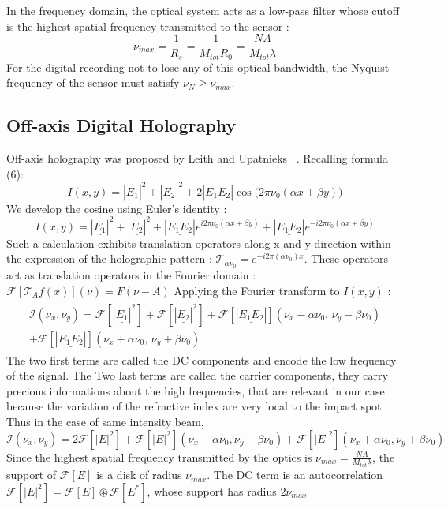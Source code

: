 \documentclass[11pt,a4paper]{article}
\begin{document}
In the frequency domain, the optical system acts as a low-pass filter whose cutoff is the highest spatial frequency transmitted to the sensor : $$\nu_{max} = \frac{1}{R_s}= \frac{1}{M_{tot}R_0}= \frac{NA}{M_{tot}\lambda}$$
For the digital recording not to lose any of this optical bandwidth, the Nyquist frequency of the sensor must satisfy $\nu_N\geq\nu_{max}$.

\subsection{Off-axis Digital Holography}
Off-axis holography was proposed by Leith and Upatnieks ~\cite{Leith}. Recalling formula (6): 
$$I(x,y) = |\underline{E_1}|^2 + |\underline{E_2}|^2  + 2|\underline{E_1E_2}| \cos\big(2\pi\nu_0(\alpha x + \beta y)\big)$$
We develop the cosine using Euler's identity :
$$I(x,y) = |\underline{E_1}|^2 + |\underline{E_2}|^2  + |\underline{E_1E_2}| e^{i2\pi\nu_0(\alpha x + \beta y)} +|\underline{E_1E_2}|e^{-i2\pi\nu_0(\alpha x + \beta y)}$$
Such a calculation exhibits translation operators along x and y direction within the expression of the holographic pattern : $ \mathcal{T}_{\alpha\nu_0} = e^{-i2\pi(\alpha\nu_0) x}$.
These operators act as translation operators in the Fourier domain : $\mathcal{F}[\mathcal{T}_A f(x)](\nu) =F(\nu-A)$
Applying the Fourier transform to $ I(x,y)$ :
\begin{align}
\begin{split}
\mathcal{I}(\nu_x,\nu_y) = \mathcal{F}[|\underline{E_1}|^2] + \mathcal{F}[|\underline{E_2}|^2] + \mathcal{F}[|\underline{E_1E_2}|](\nu_x-\alpha\nu_0,\, \nu_y -\beta\nu_0) \\+ \mathcal{F}[|\underline{E_1E_2}|](\nu_x+\alpha\nu_0,\, \nu_y +\beta\nu_0) 
\end{split}
\end{align}
The two first terms are called the DC components and encode the low frequency of the signal. The Two last terms are called the carrier components, they carry precious informations about the high frequencies, that are relevant in our case because the variation of the refractive index are very local to the impact spot.
Thus in the case of same intensity beam, 
$$\mathcal{I}(\nu_x,\nu_y) = 2 \mathcal{F}[|E|^2] + \mathcal{F}[|E|^2](\nu_x-\alpha\nu_0,\nu_y-\beta\nu_0)+ \mathcal{F}[|E|^2](\nu_x+\alpha\nu_0,\nu_y+\beta\nu_0)$$
Since the highest spatial frequency transmitted by the optics is $\nu_{max}=\frac{NA}{M_{tot}\lambda}$, the support of $\mathcal{F}[E]$ is a disk of radius $\nu_{max}$. The DC term is an autocorrelation $\mathcal{F}[|E|^2] = \mathcal{F}[E] \circledast \mathcal{F}[E^*]$, whose support has radius $2\nu_{max}$
\end{document}
